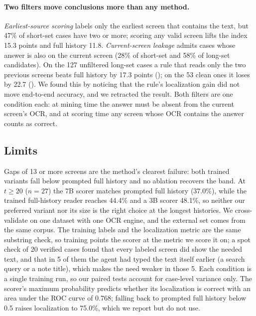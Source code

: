\paragraph{Two filters move conclusions more than any method.} \emph{Earliest-source scoring} labels only the earliest screen that contains the text, but 47\% of short-set cases have two or more; scoring any valid screen lifts the index 15.3 points and full history 11.8. \emph{Current-screen leakage} admits cases whose answer is also on the current screen (28\% of short-set and 58\% of long-set candidates). On the 127 unfiltered long-set cases a rule that reads only the two previous screens beats full history by 17.3 points (); on the 53 clean ones it loses by 22.7 (). We found this by noticing that the rule's localization gain did not move end-to-end accuracy, and we retracted the result. Both filters are one condition each: at mining time the answer must be absent from the current screen's OCR, and at scoring time any screen whose OCR contains the answer counts as correct.

\subsection{Limits}
\label{sec:limits}
Gaps of 13 or more screens are the method's clearest failure: both trained variants fall below prompted full history and no ablation recovers the band. At $t\ge20$ ($n=27$) the 7B scorer matches prompted full history (37.0\%), while the trained full-history reader reaches 44.4\% and a 3B scorer 48.1\%, so neither our preferred variant nor its size is the right choice at the longest histories. We cross-validate on one dataset with one OCR engine, and the external set comes from the same corpus. The training labels and the localization metric are the same substring check, so training points the scorer at the metric we score it on; a spot check of 20 verified cases found that every labeled screen did show the needed text, and that in 5 of them the agent had typed the text itself earlier (a search query or a note title), which makes the need weaker in those 5. Each condition is a single training run, so our paired tests account for case-level variance only. The scorer's maximum probability predicts whether its localization is correct with an area under the ROC curve of 0.768; falling back to prompted full history below 0.5 raises localization to 75.0\%, which we report but do not use.
